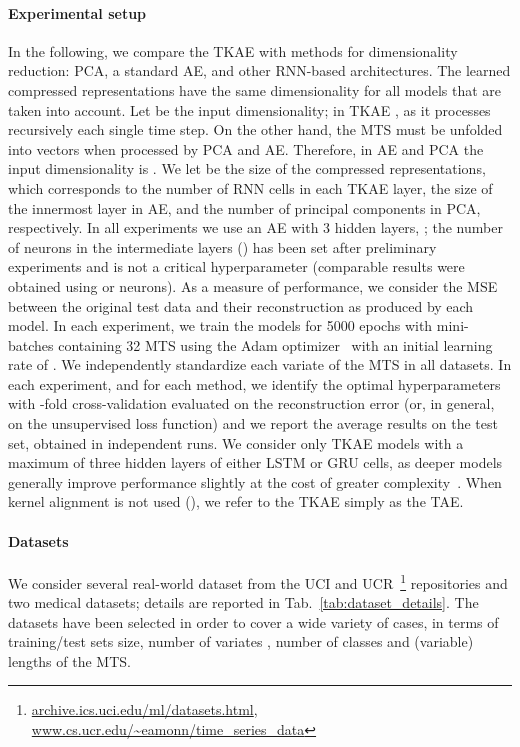 \documentclass[a4paper,10pt,pdftex]{article}
\begin{document}
\paragraph{\textbf{Experimental setup}}
In the following, we compare the TKAE with methods for dimensionality reduction: PCA, a standard AE, and other RNN-based architectures. The learned compressed representations have the same dimensionality for all models that are taken into account.
Let  be the input dimensionality; in TKAE , as it processes recursively each single time step. 
On the other hand, the MTS must be unfolded into vectors when processed by PCA and AE.
Therefore, in AE and PCA the input dimensionality is .
We let  be the size of the compressed representations, which corresponds to the number of RNN cells in each TKAE layer, the size of the innermost layer in AE, and the number of principal components in PCA, respectively.
In all experiments we use an AE with 3 hidden layers, ; the number of neurons in the intermediate layers () has been set after preliminary experiments and is not a critical hyperparameter (comparable results were obtained using  or  neurons).
As a measure of performance, we consider the MSE between the original test data and their reconstruction as produced by each model.
In each experiment, we train the models for 5000 epochs with mini-batches containing 32 MTS using the Adam optimizer~\cite{kingma2014adam} with an initial learning rate of .
We independently standardize each variate of the MTS in all datasets.
In each experiment, and for each method, we identify the optimal hyperparameters with -fold cross-validation evaluated on the reconstruction error (or, in general, on the unsupervised loss function) and we report the average results on the test set, obtained in  independent runs.
We consider only TKAE models with a maximum of three hidden layers of either LSTM or GRU cells, as deeper models generally improve performance slightly at the cost of greater complexity~\cite{reimers2017optimal}.
When kernel alignment is not used (), we refer to the TKAE simply as the TAE.

\paragraph{\textbf{Datasets}}
We consider several real-world dataset from the UCI and UCR~\footnote{\url{archive.ics.uci.edu/ml/datasets.html}, \url{www.cs.ucr.edu/~eamonn/time_series_data}} repositories and two medical datasets; details are reported in Tab.~\ref{tab:dataset_details}.
The datasets have been selected in order to cover a wide variety of cases, in terms of training/test sets size, number of variates , number of classes and (variable) lengths  of the MTS.
\end{document}
